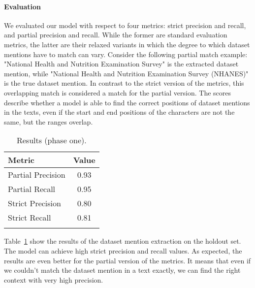 \paragraph{Evaluation}
We evaluated our model with respect to four metrics: strict precision and recall, and partial precision and recall.
While the former are standard evaluation metrics, the latter are their relaxed variants in which the degree to which dataset mentions have to match can vary. 
Consider the following partial match example: "National Health and Nutrition Examination Survey" is the extracted dataset mention, while "National Health and Nutrition Examination Survey (NHANES)" is the true dataset mention. 
In contrast to the strict version of the metrics, this overlapping match is considered a match for the partial version.
The scores describe whether a model is able to find the correct positions of dataset mentions in the texts, even if the start and end positions of the characters are not the same, but the ranges overlap.
\begin{table}[b]
    \center 
    \caption{Results (phase one). } 
    \begin{tabular}{lc} 
        \toprule
        Metric  & Value \\
        \midrule
        Partial Precision   & 0.93 \\
        Partial Recall      & 0.95 \\
        \midrule
        Strict Precision    & 0.80 \\
        Strict Recall       & 0.81 \\ 
        \bottomrule \\ 
    \end{tabular} 
    \label{table:dataset-mention-eval} 
\end{table}

Table~\ref{table:dataset-mention-eval} show the results of the dataset mention extraction on the holdout set. The model can achieve high strict precision and recall values. As expected, the results are even better for the partial version of the metrics. It means that even if we couldn't match the dataset mention in a text exactly, we can find the right context with very high precision.

